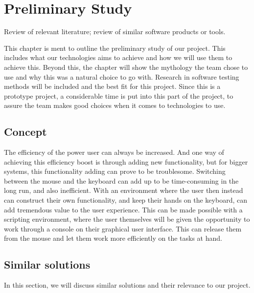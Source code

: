 \chapter{Preliminary Study}

\minitoc

Review  of  relevant    literature; review  of  similar software    products    or  tools.



This chapter is ment to outline the preliminary study of our project. This includes what our technologies aims to achieve and how we will use them to achieve this. Beyond this, the chapter will show the mythology the team chose to use and why this was a natural choice to go with. Research in software testing methods will be included and the best fit for this project. Since this is a prototype project, a considerable time is put into this part of the project, to assure the team makes good choices when it comes to technologies to use.

\clearpage

\section{Concept}
The efficiency of the power user can always be increased. And one way of achieving this efficiency boost is through adding new functionality, but for bigger systems, this functionality adding can prove to be troublesome. Switching between the mouse and the keyboard can add up to be time-consuming in the long run, and also inefficient. With an environment where the user then instead can construct their own functionality, and keep their hands on the keyboard, can add tremendous value to the user experience. This can be made possible with a scripting environment, where the user themselves will be given the opportunity to work through a console on their graphical user interface. This can release them from the mouse and let them work more efficiently on the tasks at hand.

\section{Similar solutions}
In this section, we will discuss similar solutions and their relevance to our project.

